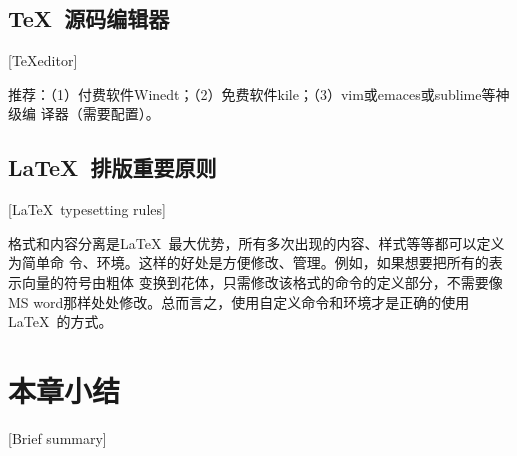 \subsection{\TeX\ 源码编辑器}[\TeX editor]

推荐：（1）付费软件Winedt；（2）免费软件kile；（3）vim或emaces或sublime等神级编
译器（需要配置）。

\subsection{\LaTeX\ 排版重要原则}[\LaTeX\ typesetting rules]

格式和内容分离是\LaTeX\ 最大优势，所有多次出现的内容、样式等等都可以定义为简单命
令、环境。这样的好处是方便修改、管理。例如，如果想要把所有的表示向量的符号由粗体
变换到花体，只需修改该格式的命令的定义部分，不需要像MS
word那样处处修改。总而言之，使用自定义命令和环境才是正确的使用\LaTeX\ 的方式。

\section{本章小结}[Brief summary]

\lipsum[2]
